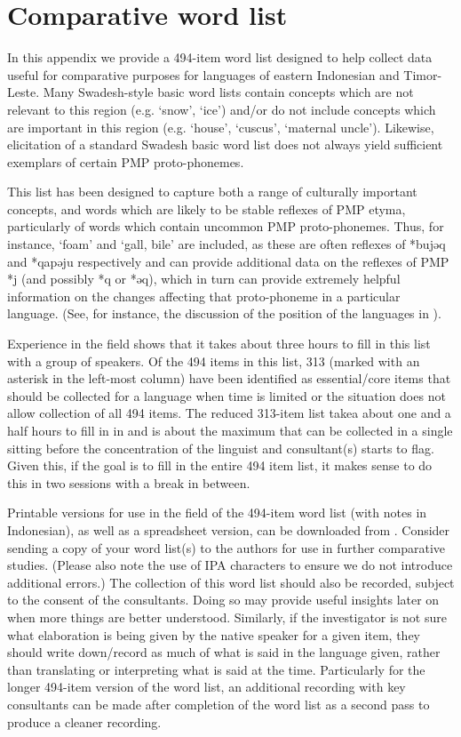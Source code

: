\chapter{Comparative word list}\label{ch:ComWor}
In this appendix we provide a 494-item word list designed to help
collect data useful for comparative purposes for
languages of eastern Indonesian and Timor-Leste.
Many Swadesh-style basic word lists contain concepts which are
not relevant to this region (e.g.
‘snow’, ‘ice’) and/or do not include concepts which are important
in this region (e.g.
‘house’, ‘cuscus’, ‘maternal uncle’).
Likewise, elicitation of a standard Swadesh basic word list does
not always yield sufficient exemplars of certain PMP proto-phonemes.

This list has been designed to capture both a range of culturally
important concepts, and words which are likely to be stable reflexes of PMP etyma,
particularly of words which contain uncommon PMP proto-phonemes.
Thus, for instance, ‘foam’
and ‘gall, bile’ are included, as these are often reflexes of
*bujəq and *qapəju respectively and can provide additional data on the
reflexes of PMP *j (and possibly *q or *əq),
which in turn can provide extremely helpful information on the
changes affecting that proto-phoneme in a particular language.
(See, for instance, the discussion of the position of the  languages in ).

Experience in the field shows that it takes about three
hours to fill in this list with a group of speakers.
Of the 494 items in this list,
313 (marked with an asterisk in the left-most column) have been
identified as essential/core items that should be collected for
a language when time is limited or the situation does not allow
collection of all 494 items.
The reduced 313-item list takea about one and a half hours
to fill in in and is about the maximum
that can be collected in a single sitting before the concentration
of the linguist and consultant(s) starts to flag.
Given this, if the goal is to fill in the entire 494 item list,
it makes sense to do this in two sessions with a break in between.

Printable versions for use in the field of the 494-item word list
(with notes in Indonesian),
as well as a spreadsheet version,
can be downloaded from \textcolor{red}{}.
Consider sending a copy of your word list(s) to the authors for
use in further comparative studies.
(Please also note the use of IPA characters to ensure we do not
introduce additional errors.) 
The collection of this word list should also be recorded,
subject to the consent of the consultants.
Doing so may provide useful insights later on when more things are better understood.
Similarly, if the investigator is not sure what elaboration is
being given by the native speaker for a given item, they should
write down/record as much of what is said in the language given,
rather than translating or interpreting what is said at the time.
Particularly for the longer 494-item version of the word list,
an additional recording with key consultants can be made after
completion of the word list as a second pass to produce a cleaner recording.


